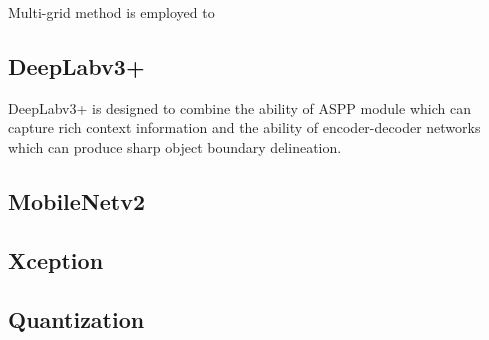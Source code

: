 Multi-grid method is employed to 

\subsection{DeepLabv3+}

DeepLabv3+ is designed to combine the ability of ASPP module which can capture rich context information and the ability of encoder-decoder networks which can produce sharp object boundary delineation.  

\subsection{MobileNetv2}

\subsection{Xception}

\subsection{Quantization}
